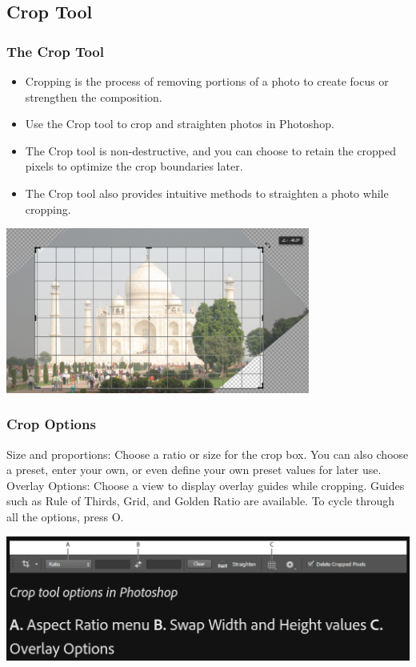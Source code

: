 \documentclass{beamer}
\begin{document}
		\subsection{Crop Tool}
\begin{frame}
	\frametitle{The Crop Tool}
	\begin{itemize}
		\item Cropping is the process of removing portions of a photo to create focus or strengthen the composition. 
		\item Use the Crop tool to crop and straighten photos in Photoshop. 
		\item The Crop tool is non-destructive, and you can choose to retain the cropped pixels to optimize the crop boundaries later.
		\item The Crop tool also provides intuitive methods to straighten a photo while cropping.
	\end{itemize}
	\begin{center}
		\includegraphics[width = 0.75\textwidth]{images/crop 1.png}
	\end{center}
\end{frame}

\begin{frame}
	\frametitle{Crop Options}
	\begin{outline}
		\1 Size and proportions:
		\2 Choose a ratio or size for the crop box. You can also choose a preset, enter your own, or even define your own preset values for later use.
		\1 Overlay Options:
		\2 Choose a view to display overlay guides while cropping. Guides such as Rule of Thirds, Grid, and Golden Ratio are available. To cycle through all the options, press O.
	\end{outline}
	\begin{center}
		\includegraphics[width = 1.0\textwidth]{images/crop 2.png}
	\end{center}
\end{frame}
\end{document}
